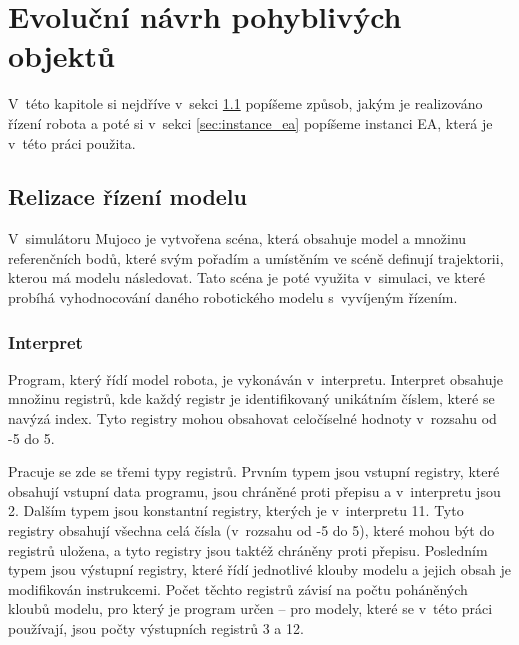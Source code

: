 
\chapter{Evoluční návrh pohyblivých objektů}
\label{chap:evolucni_navrh_pohyblivych_objektu}
V~této kapitole si nejdříve v~sekci \ref{sec:realizace_rizeni_modelu} popíšeme způsob, jakým je realizováno řízení robota a poté si v~sekci \ref{sec:instance_ea} popíšeme instanci EA, která je v~této práci použita.


\section{Relizace řízení modelu}
\label{sec:realizace_rizeni_modelu}

V~simulátoru Mujoco je vytvořena scéna, která obsahuje model a množinu referenčních bodů, které svým pořadím a umístěním ve scéně definují trajektorii, kterou má modelu následovat. Tato scéna je poté využita v~simulaci, ve které probíhá vyhodnocování daného robotického modelu s~vyvíjeným řízením.

\subsection{Interpret}

Program, který řídí model robota, je vykonáván v~interpretu.
Interpret obsahuje množinu registrů, kde každý registr je identifikovaný unikátním číslem, které se navýzá index.
Tyto registry mohou obsahovat celočíselné hodnoty v~rozsahu od -5 do 5.

Pracuje se zde se třemi typy registrů.
Prvním typem jsou vstupní registry, které obsahují vstupní data programu, jsou chráněné proti přepisu a v~interpretu jsou 2.
Dalším typem jsou konstantní registry, kterých je v~interpretu 11.
Tyto registry obsahují všechna celá čísla (v~rozsahu od -5 do 5), které mohou být do registrů uložena, a tyto registry jsou taktéž chráněny proti přepisu.
Posledním typem jsou výstupní registry, které řídí jednotlivé klouby modelu a jejich obsah je modifikován instrukcemi.
Počet těchto registrů závisí na počtu poháněných kloubů modelu, pro který je program určen -- pro modely, které se v~této práci používají, jsou počty výstupních registrů 3 a 12.


